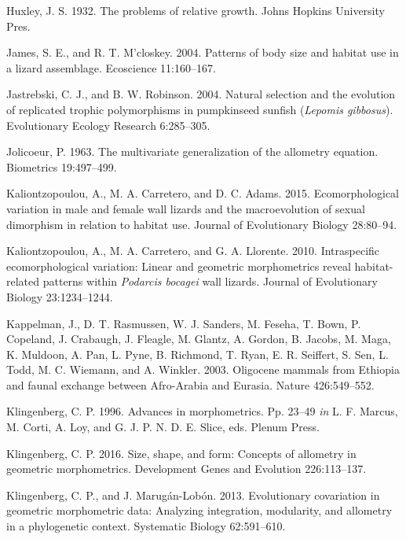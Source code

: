\documentclass[
  11pt,
]{article}
\begin{document}
\leavevmode\hypertarget{ref-Huxley1932}{}%
Huxley, J. S. 1932. The problems of relative growth. Johns Hopkins
University Pres.

\leavevmode\hypertarget{ref-James2004}{}%
James, S. E., and R. T. M'closkey. 2004. Patterns of body size and
habitat use in a lizard assemblage. Ecoscience 11:160--167.

\leavevmode\hypertarget{ref-Jastrebski2004}{}%
Jastrebski, C. J., and B. W. Robinson. 2004. Natural selection and the
evolution of replicated trophic polymorphisms in pumpkinseed sunfish
(\emph{Lepomis gibbosus}). Evolutionary Ecology Research 6:285--305.

\leavevmode\hypertarget{ref-Jolicoeur1963}{}%
Jolicoeur, P. 1963. The multivariate generalization of the allometry
equation. Biometrics 19:497--499.

\leavevmode\hypertarget{ref-Kaliontzopoulou2015}{}%
Kaliontzopoulou, A., M. A. Carretero, and D. C. Adams. 2015.
Ecomorphological variation in male and female wall lizards and the
macroevolution of sexual dimorphism in relation to habitat use. Journal
of Evolutionary Biology 28:80--94.

\leavevmode\hypertarget{ref-KALIONTZOPOULOU2010}{}%
Kaliontzopoulou, A., M. A. Carretero, and G. A. Llorente. 2010.
Intraspecific ecomorphological variation: Linear and geometric
morphometrics reveal habitat-related patterns within \emph{Podarcis
bocagei} wall lizards. Journal of Evolutionary Biology 23:1234--1244.

\leavevmode\hypertarget{ref-Kappelman2003}{}%
Kappelman, J., D. T. Rasmussen, W. J. Sanders, M. Feseha, T. Bown, P.
Copeland, J. Crabaugh, J. Fleagle, M. Glantz, A. Gordon, B. Jacobs, M.
Maga, K. Muldoon, A. Pan, L. Pyne, B. Richmond, T. Ryan, E. R. Seiffert,
S. Sen, L. Todd, M. C. Wiemann, and A. Winkler. 2003. Oligocene mammals
from Ethiopia and faunal exchange between Afro-Arabia and Eurasia.
Nature 426:549--552.

\leavevmode\hypertarget{ref-Klingenbert1996}{}%
Klingenberg, C. P. 1996. Advances in morphometrics. Pp. 23--49 \emph{in}
L. F. Marcus, M. Corti, A. Loy, and G. J. P. N. D. E. Slice, eds. Plenum
Press.

\leavevmode\hypertarget{ref-Klingenberg2016}{}%
Klingenberg, C. P. 2016. Size, shape, and form: Concepts of allometry in
geometric morphometrics. Development Genes and Evolution 226:113--137.

\leavevmode\hypertarget{ref-Klingenberg2013}{}%
Klingenberg, C. P., and J. Marugán-Lobón. 2013. Evolutionary covariation
in geometric morphometric data: Analyzing integration, modularity, and
allometry in a phylogenetic context. Systematic Biology 62:591--610.
\end{document}
